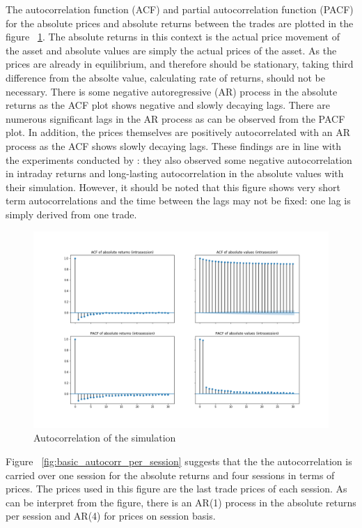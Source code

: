 The autocorrelation function (ACF) and partial autocorrelation function (PACF) for the absolute prices and absolute returns between
the trades are plotted in the figure ~\ref{fig:basic_autocorr}. The absolute returns in this context is the actual price movement of 
the asset and absolute values are simply the actual prices of the asset. As the prices are already in equilibrium, and therefore should be 
stationary, taking third difference from the absolte value, calculating rate of returns, should not be necessary. There is some negative 
autoregressive (AR) process in the absolute returns as the ACF plot shows negative and slowly decaying lags. There are numerous 
significant lags in the AR process as can be observed from the PACF plot. In addition, the prices themselves are 
positively autocorrelated with an AR process as the ACF shows slowly decaying lags. These findings are in line with the experiments conducted by \citet{Raberto05}: 
they also observed some negative autocorrelation in intraday returns and long-lasting autocorrelation in the absolute
values with their simulation. However, it should be noted that this figure shows very short term
autocorrelations and the time between the lags may not be fixed: one lag is simply derived from one
trade. 


\begin{figure}
    \includegraphics[width=\linewidth]{plots/basic_autocorrelation_intra.png}
    \caption{Autocorrelation of the simulation} %
    \label{fig:basic_autocorr}
\end{figure}

Figure ~\ref{fig:basic_autocorr_per_session} suggests that the the autocorrelation is carried over one
session for the absolute returns and four sessions in terms of prices. The prices used in this figure are 
the last trade prices of each session. As can be interpret from the figure, there is an AR(1) process in 
the absolute returns per session and AR(4) for prices on session basis.

